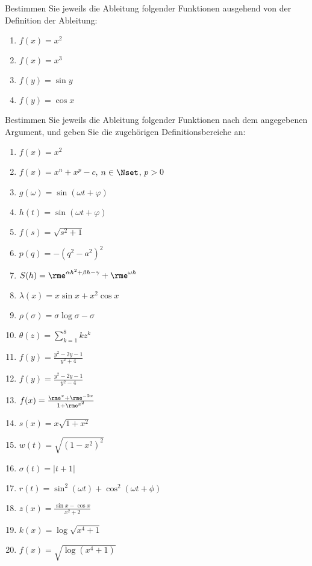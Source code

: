 
Bestimmen Sie jeweils die Ableitung folgender Funktionen ausgehend von der Definition der Ableitung:\\
\parbox{0.5\textwidth}{\begin{enumerate}
\item $f(x)=x^2$
\item $f(x)=x^3$
\end{enumerate}}\parbox{0.5\textwidth}{\begin{enumerate}\setcounter{enumi}{2}
\item $f(y)=\sin y$
\item $f(y)=\cos x$
\end{enumerate}}


\pagebreak


Bestimmen Sie jeweils die Ableitung folgender Funktionen nach dem angegebenen Argument, und geben Sie die zugehörigen Definitionsbereiche an:\\
\parbox{0.5\textwidth}{\begin{enumerate}
\item $f(x)=x^2$
\item $f(x)=x^n+x^p-c$, $n\in\Nset$, $p>0$
\item $g(\omega)=\sin(\omega t+\varphi)$
\item $h(t)=\sin(\omega t+\varphi)$
\item $f(s)=\sqrt{s^2+1}$
\item $p(q)=-(q^2-a^2)^2$
\item $S(h)=\rme^{\alpha h^2+\beta h-\gamma}+\rme^{\omega h}$
\item $\lambda(x)=x\sin x+x^2\cos x$
\item $\rho(\sigma)=\sigma\log\sigma-\sigma$
\item $\theta(z)=\sum_{k=1}^8 k z^k$
\end{enumerate}}\parbox{0.5\textwidth}{\begin{enumerate}\setcounter{enumi}{10}
\item $f(y)=\frac{y^2-2y-1}{y^2+4}$
\item $f(y)=\frac{y^2-2y-1}{y^2-4}$
\item $f(x)=\frac{\rme^x+\rme^{-2x}}{1+\rme^{x^2}}$
\item $s(x)=x\sqrt{1+x^2}$
\item $w(t)=\sqrt{\left(1-x^2\right)^2}$
\item $\sigma(t)=|t+1|$
\item $r(t)=\sin^2(\omega t)+\cos^2(\omega t+\phi)$
\item $z(x)=\frac{\sin x-\cos x}{x^2+2}$
\item $k(x)=\log\sqrt{x^4+1}$
\item $f(x)=\sqrt{\log(x^4+1)}$
\end{enumerate}}



